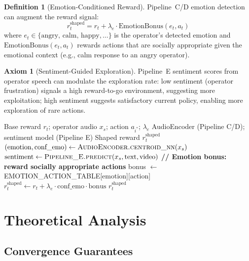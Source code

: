 \documentclass[12pt,a4paper]{article}
\theoremstyle{definition}
\newtheorem{definition}{Definition}[section]
\newtheorem{axiom}{Axiom}[section]
\theoremstyle{plain}
\theoremstyle{remark}
\begin{document}
\begin{definition}[Emotion-Conditioned Reward]
Pipeline~C/D emotion detection can augment the reward signal:
\[
  r_t^{\text{shaped}} = r_t + \lambda_e \cdot \text{EmotionBonus}(e_t, a_t)
\]
where $e_t \in \{\text{angry, calm, happy}, \ldots\}$ is the operator's detected emotion and $\text{EmotionBonus}(e_t, a_t)$ rewards actions that are socially appropriate given the emotional context (e.g., calm response to an angry operator).
\end{definition}

\begin{axiom}[Sentiment-Guided Exploration]
Pipeline~E sentiment scores from operator speech can modulate the exploration rate: low sentiment (operator frustration) signals a high reward-to-go environment, suggesting more exploitation; high sentiment suggests satisfactory current policy, enabling more exploration of rare actions.
\end{axiom}

\begin{algorithm}[H]
\caption{Emotion-Conditioned Reward Shaping}
\label{alg:reward_shape}
\begin{algorithmic}[1]
\Require Base reward $r_t$; operator audio $x_s$; action $a_{i^*}$; $\lambda_e$
\Require AudioEncoder (Pipeline C/D); sentiment model (Pipeline E)
\Ensure Shaped reward $r_t^{\text{shaped}}$
\State $(\text{emotion}, \text{conf\_emo}) \gets \textsc{AudioEncoder.centroid\_nn}(x_s)$
\State $\text{sentiment} \gets \textsc{Pipeline\_E.predict}(x_s, \text{text}, \text{video})$
\State \textbf{// Emotion bonus: reward socially appropriate actions}
\State bonus $\gets$ EMOTION\_ACTION\_TABLE[emotion][action]
\State $r_t^{\text{shaped}} \gets r_t + \lambda_e \cdot \text{conf\_emo} \cdot \text{bonus}$
\State \Return $r_t^{\text{shaped}}$
\end{algorithmic}
\end{algorithm}

\newpage
\section{Theoretical Analysis}
\label{sec:theory}

\subsection{Convergence Guarantees}
\end{document}
